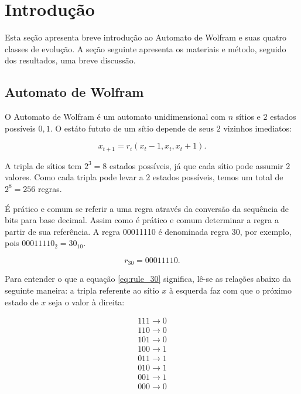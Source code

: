
\section{Introdução}

Esta seção apresenta breve introdução ao Automato de Wolfram e suas quatro
classes de evolução. A seção seguinte apresenta os materiais e método, seguido
dos resultados, uma breve discussão.

\subsection{Automato de Wolfram}

O Automato de Wolfram \cite{2002:Wolfram:New:Science} é um automato
unidimensional com $n$ sítios e $2$ estados possíveis ${0, 1}$. O estáto
fututo de um sítio depende de seus $2$ vizinhos imediatos:

\begin{equation}
  x_{t+1} = r_i(x_t-1, x_t, x_t+1).
\end{equation}

\vspace{5mm}
A tripla de sítios tem $2^3 = 8$ estados possíveis, já que cada sítio pode
assumir $2$ valores. Como cada tripla pode levar a $2$ estados possíveis, temos
um total de $2^8 = 256$ regras.

\vspace{5mm}
É prático e comum se referir a uma regra através da conversão da sequência de
bits para base decimal. Assim como é prático e comum determinar a regra a partir
de sua referência. A regra 00011110 é denominada regra 30, por exemplo, pois
$00011110_2 = 30_{10}$.

\begin{equation}
  r_{30} = 00011110.
  \label{eq:rule_30}
\end{equation}

\vspace{5mm}
Para entender o que a equação \ref{eq:rule_30} significa, lê-se as relações
abaixo da seguinte maneira: a tripla referente ao sítio $x$ à esquerda faz com
que o próximo estado de $x$ seja o valor à direita:

\begin{equation}
  \begin{aligned}
    111 \rightarrow 0 \\
    110 \rightarrow 0 \\
    101 \rightarrow 0 \\
    100 \rightarrow 1 \\
    011 \rightarrow 1 \\
    010 \rightarrow 1 \\
    001 \rightarrow 1 \\
    000 \rightarrow 0
  \end{aligned}
  \label{eq:rule_30_values}
\end{equation}

